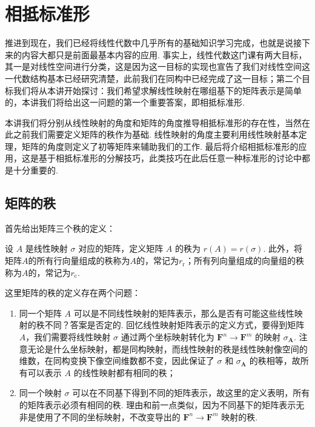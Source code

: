 \chapter{相抵标准形}

推进到现在，我们已经将线性代数中几乎所有的基础知识学习完成，也就是说接下来的内容大都只是前面最基本内容的应用. 事实上，线性代数这门课有两大目标，其一是对线性空间进行分类，这是因为这一目标的实现也宣告了我们对线性空间这一代数结构基本已经研究清楚，此前我们在同构中已经完成了这一目标；第二个目标我们将从本讲开始探讨：我们希望求解线性映射在哪组基下的矩阵表示是简单的，本讲我们将给出这一问题的第一个重要答案，即相抵标准形.

本讲我们将分别从线性映射的角度和矩阵的角度推导相抵标准形的存在性，当然在此之前我们需要定义矩阵的秩作为基础. 线性映射的角度主要利用线性映射基本定理，矩阵的角度则定义了初等矩阵来辅助我们的工作. 最后将介绍相抵标准形的应用，这是基于相抵标准形的分解技巧，此类技巧在此后任意一种标准形的讨论中都是十分重要的.

\section{矩阵的秩}

首先给出矩阵三个秩的定义：
\begin{definition}{}{}
    设 $A$ 是线性映射 $\sigma$ 对应的矩阵，定义矩阵 $A$ 的秩为 $r(A) = r(\sigma)$. 此外，将矩阵$A$的所有行向量组成的秩称为$A$的，常记为$r_{\mathrm{r}}$；所有列向量组成的向量组的秩称为$A$的，常记为$r_{\mathrm{c}}$.
\end{definition}

这里矩阵的秩的定义存在两个问题：
\begin{enumerate}
    \item 同一个矩阵 $A$ 可以是不同线性映射的矩阵表示，那么是否有可能这些线性映射的秩不同？答案是否定的. 回忆线性映射矩阵表示的定义方式，要得到矩阵 $A$，我们需要将线性映射 $\sigma$ 通过两个坐标映射转化为 $\mathbf{F}^n \to \mathbf{F}^m$ 的映射 $\sigma_\mathbf{A}$. 注意无论是什么坐标映射，都是同构映射，而线性映射的秩是线性映射像空间的维数，在同构变换下像空间维数都不变，因此保证了 $\sigma$ 和 $\sigma_\mathbf{A}$ 的秩相等，故所有可以表示 $A$ 的线性映射都有相同的秩；
    \item 同一个映射 $\sigma$ 可以在不同基下得到不同的矩阵表示，故这里的定义表明，所有的矩阵表示必须有相同的秩. 理由和前一点类似，因为不同基下的矩阵表示无非是使用了不同的坐标映射，不改变导出的 $\mathbf{F}^n \to \mathbf{F}^m$ 映射的秩.
\end{enumerate}

